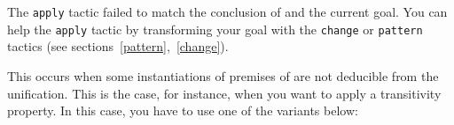 \begin{ErrMsgs}
\item {} 

  The {\tt apply}
  tactic failed to match the conclusion of {\term} and the current goal.
  You can help the {\tt apply} tactic by transforming your
  goal with the {\tt change} or {\tt pattern} tactics (see 
  sections~\ref{pattern},~\ref{change}).

\item {}

  This occurs when some instantiations of premises of {\term} are not
  deducible from the unification. This is the case, for instance, when
  you want to apply a transitivity property. In this case, you have to
  use one of the variants below:

\end{ErrMsgs}

